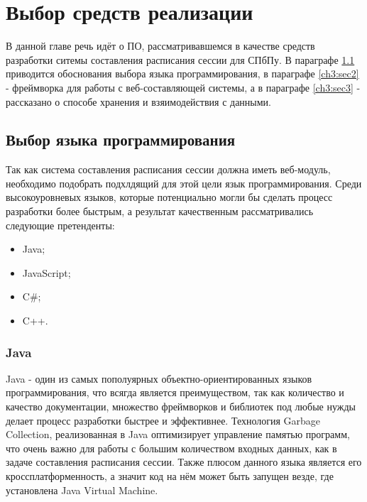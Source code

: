 \chapter{Выбор средств реализации} \label{ch3}

В данной главе речь идёт о ПО, рассматривавшемся в качестве средств разработки ситемы составления расписания сессии для СПбПу. В параграфе \ref{ch3:sec1} приводится обоснования выбора языка программирования, в параграфе \ref{ch3:sec2} - фреймворка для работы с веб-составляющей системы, а в параграфе \ref{ch3:sec3} - рассказано о способе хранения и взяимодействия с данными.
	
\section{Выбор языка программирования} \label{ch3:sec1}
Так как система составления расписания сессии должна иметь веб-модуль, необходимо подобрать подхлдящий для этой цели язык программирования. Среди высокоуровневых языков, которые потенциально могли бы сделать процесс разработки более быстрым, а результат качественным рассматривались следующие претенденты: 
\begin{itemize}
\item  Java;
\item  JavaScript;
\item  C\#;	
\item  C++.	
\end{itemize}

\subsection{Java}
Java - один из самых пополуярных объектно-ориентированных языков программирования, что всягда является преимуществом, так как количество и качество документации, множество фреймворков и библиотек под любые нужды делает процесс разработки быстрее и эффективнее. Технология Garbage Collection, реализованная в Java оптимизирует управление памятью программ, что очень важно для работы с большим количеством входных данных, как в задаче составления расписания сессии. Также плюсом данного языка является его кроссплатформенность, а значит код на нём может быть запущен везде, где установлена Java Virtual Machine. 

